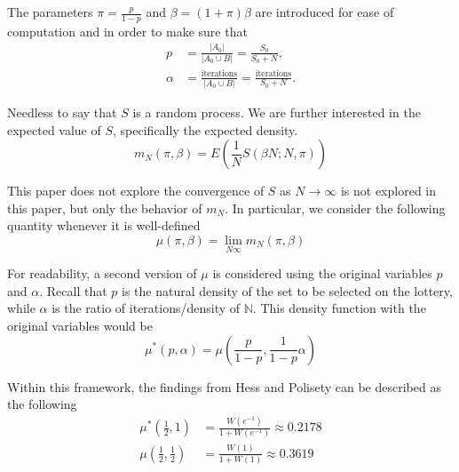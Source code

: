 \documentclass{article}
\newcommand{\N}{\mathbb{N}}
\newcommand{\card}[1]{\left| #1 \right|}
\newcommand{\ppar}[1]{\left( #1 \right)}
\begin{document}
The parameters $\pi = \frac{p}{1-p}$ and $\beta = \ppar{1+\pi} \beta$ are introduced for ease of computation and in order to make sure that
\begin{align}
    p &=
    \frac{\card{A_0}}{\card{A_0 \cup B}} = \frac{S_0}{S_0+N},
    \\
    \alpha &=
    \frac{\text{iterations}}{\card{A_0 \cup B}} =
    \frac{\text{iterations}}{S_0+N}.
\end{align}

Needless to say that $S$ is a random process.
%
We are further interested in the expected value of $S$, specifically the expected density.
\begin{equation}
    m_N\ppar{\pi, \beta} = E\ppar{\frac{1}{N}S\ppar{\beta N; N, \pi }}
\end{equation}

This paper does not explore the convergence of $S$ as $N \rightarrow \infty$ is not explored in this paper, but only the behavior of $m_N$. 
%
In particular, we consider the following quantity whenever it is well-defined
\begin{equation}
    \mu\ppar{\pi, \beta} = \lim_{N\infty} m_N\ppar{\pi, \beta}
\end{equation}

For readability, a second version of $\mu$ is considered using the original variables $p$ and $\alpha$. 
%
Recall that $p$ is the natural density of the set to be selected on the lottery, while $\alpha$ is the ratio of iterations/density of $\N$.
%
This density function with the original variables would be
\begin{equation}
    \mu^*\ppar{p, \alpha} = \mu\ppar{\frac{p}{1-p}, \frac{1}{1-p} \alpha}
\end{equation}

Within this framework,
the findings from Hess and Polisety \cite{hess2023} can be described as the following
\begin{align}
\mu^*\ppar{\frac{1}{2}, 1}
    &=
    \frac{W\ppar{e^{-1}}}{1+W\ppar{e^{-1}}} \approx 0.2178
    \\
\mu\ppar{\frac{1}{2}, \frac{1}{2}}
    &=
    \frac{W\ppar{1}}{1+W\ppar{1}} \approx 0.3619
\end{align}

\end{document}
